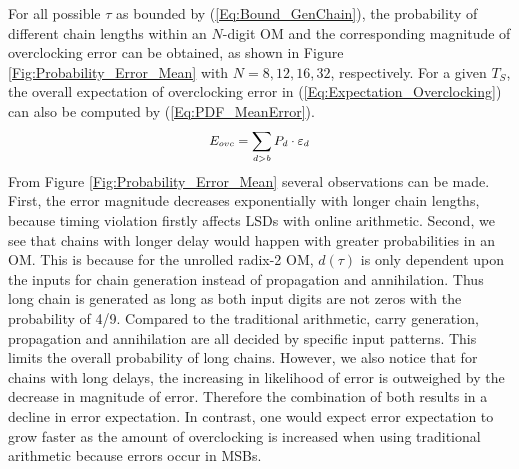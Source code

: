 \documentclass{acm_proc_article-sp}
\begin{document}
\vspace{-2ex}
For all possible $\tau$ as bounded by (\ref{Eq:Bound_GenChain}), the probability of different chain lengths within an $N$-digit OM and the corresponding magnitude of overclocking error can be obtained, as shown in Figure \ref{Fig:Probability_Error_Mean} with $N=8,12,16,32$, respectively. For a given $T_S$, the overall expectation of overclocking error in (\ref{Eq:Expectation_Overclocking}) can also be computed by (\ref{Eq:PDF_MeanError}).
%
\begin{eqnarray}\label{Eq:PDF_MeanError}
\scriptsize
  E_{ovc}=\sum_{d>b}P_d\cdot\varepsilon_d
\normalsize
\end{eqnarray}
%
From Figure \ref{Fig:Probability_Error_Mean} several observations can be made. First, the error magnitude decreases exponentially with longer chain lengths, because timing violation firstly affects LSDs with online arithmetic. Second, we see that chains with longer delay would happen with greater probabilities in an OM. This is because for the unrolled radix-2 OM, $d(\tau)$ is only dependent upon the inputs for chain generation instead of propagation and annihilation. Thus long chain is generated as long as both input digits are not zeros with the probability of 4/9. Compared to the traditional arithmetic, carry generation, propagation and annihilation are all decided by specific input patterns. This limits the overall probability of long chains. However, we also notice that for chains with long delays, the increasing in likelihood of error is outweighed by the decrease in magnitude of error. Therefore the combination of both results in a decline in error expectation. In contrast, one would expect error expectation to grow faster as the amount of overclocking is increased when using traditional arithmetic because errors occur in MSBs.


\end{document}
